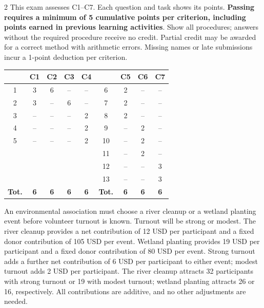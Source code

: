 \begin{multicols}{2}
\raggedcolumns
{}
This exam assesses C1--C7. Each question and task shows its points. \textbf{Passing requires a minimum of 5 cumulative points per criterion, including points earned in previous learning activities}. Show all procedures; answers without the required procedure receive no credit. Partial credit may be awarded for a correct method with arithmetic errors. Missing names or late submissions incur a 1-point deduction per criterion.


\begin{center}
	\small\setlength{\tabcolsep}{5pt}
	\begin{tabular}{|c|c|c|c|c||c|c|c|c|}
		\hline
		\textbf{\textnumero}&\textbf{C1}&\textbf{C2}&\textbf{C3}&\textbf{C4}&
		\textbf{\textnumero}&\textbf{C5}&\textbf{C6}&\textbf{C7}\\\hline
		1&3&6&--&--&6&2&--&--\\\hline
		2&3&--&6&--&7&2&--&--\\\hline
		3&--&--&--&2&8&2&--&--\\\hline
		4&--&--&--&2&9&--&2&--\\\hline
		5&--&--&--&2&10&--&2&--\\\hline
		&&&&&11&--&2&--\\\hline
		&&&&&12&--&--&3\\\hline
		&&&&&13&--&--&3\\\hline
		\textbf{Tot.}&\textbf{6}&\textbf{6}&\textbf{6}&\textbf{6}&
		\textbf{Tot.}&\textbf{6}&\textbf{6}&\textbf{6}\\\hline
	\end{tabular}
\end{center}


\begin{minipage}{\linewidth}
An environmental association must choose a river cleanup or a wetland planting event before volunteer turnout is known. Turnout will be strong or modest. The river cleanup provides a net contribution of 12 USD per participant and a fixed donor contribution of 105 USD per event. Wetland planting provides 19 USD per participant and a fixed donor contribution of 80 USD per event. Strong turnout adds a further net contribution of 6 USD per participant to either event; modest turnout adds 2 USD per participant. The river cleanup attracts 32 participants with strong turnout or 19 with modest turnout; wetland planting attracts 26 or 16, respectively. All contributions are additive, and no other adjustments are needed.


\end{minipage}
\end{multicols}
